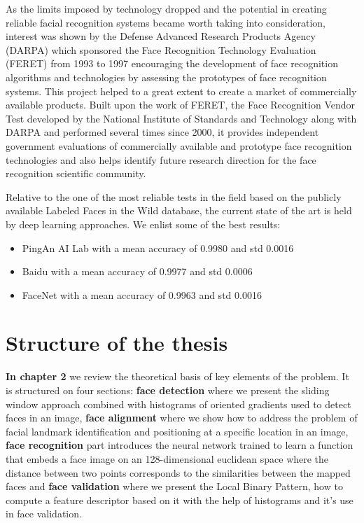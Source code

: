As the limits imposed by technology dropped and the potential in creating reliable facial recognition systems became worth taking into consideration, interest was shown by the Defense Advanced Research Products Agency (DARPA) which sponsored the Face Recognition Technology Evaluation (FERET) \cite{PhillipsJMHRSRP00} from 1993 to 1997 encouraging the development of face recognition algorithms and technologies by assessing the prototypes of face recognition systems. This project helped to a great extent to create a market of commercially available products.
Built upon the work of FERET, the Face Recognition Vendor Test \cite{PhillipsGMBTB03} developed by the National Institute of Standards and Technology \cite{FaceNist} along with DARPA and performed several times since 2000, it provides independent government evaluations of commercially available and prototype face recognition technologies and also helps identify future research direction for the face recognition scientific community.

Relative to the one of the most reliable tests in the field based on the publicly available Labeled Faces in the Wild database, the current state of the art is held by deep learning approaches. We enlist some of the best results:
\begin{itemize}
	\item PingAn AI Lab with a mean accuracy of 0.9980 and std 0.0016
	\item Baidu with a mean accuracy of 0.9977 and std 0.0006
	\item FaceNet with a mean accuracy of 0.9963 and std 0.0016
\end{itemize}

\section{Structure of the thesis} 

\textbf{In chapter 2} we review the theoretical basis of key elements of the problem. It is structured on four sections: \textbf{face detection} where we present the sliding window approach combined with histograms of oriented gradients used to detect faces in an image, \textbf{face alignment} where we show how to address the problem of facial landmark identification and positioning at a specific location in an image, \textbf{face recognition} part introduces the neural network trained to learn a function that embeds a face image on an 128-dimensional euclidean space where the distance between two points corresponds to the similarities between the mapped faces and \textbf{face validation} where we present the Local Binary Pattern, how to compute a feature descriptor based on it with the help of histograms and it's use in face validation.

